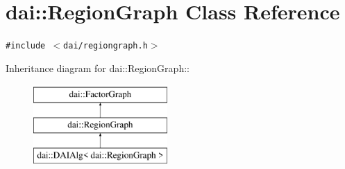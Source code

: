 \hypertarget{classdai_1_1RegionGraph}{
\section{dai::RegionGraph Class Reference}
\label{classdai_1_1RegionGraph}
}
{\tt \#include $<$dai/regiongraph.h$>$}

Inheritance diagram for dai::RegionGraph::\begin{figure}[H]
\begin{center}
\leavevmode
\includegraphics[height=3cm]{classdai_1_1RegionGraph}
\end{center}
\end{figure}


